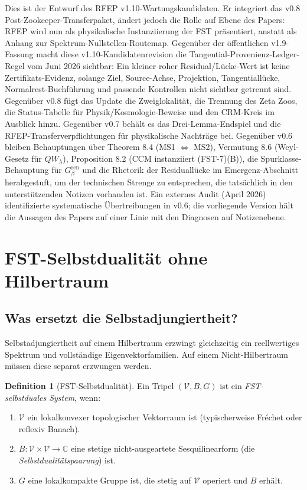 \documentclass[11pt,a4paper]{article}
\theoremstyle{plain}
\theoremstyle{definition}
\newtheorem{definition}[theorem]{Definition}
\newcommand{\C}{\mathbb{C}}
\newcommand{\V}{\mathcal{V}}
\begin{document}
Dies ist der Entwurf des RFEP v1.10-Wartungskandidaten. Er integriert das v0.8 Post-Zookeeper-Transferpaket,
ändert jedoch die Rolle auf Ebene des Papers: RFEP wird nun als physikalische Instanziierung
der FST präsentiert, anstatt als Anhang zur Spektrum-Nullstellen-Routemap. Gegenüber
der öffentlichen v1.9-Fassung macht diese v1.10-Kandidatenrevision die
Tangential-Provenienz-Ledger-Regel vom Juni 2026 sichtbar: Ein kleiner
roher Residual/Lücke-Wert ist keine Zertifikats-Evidenz, solange Ziel,
Source-Achse, Projektion, Tangentiallücke, Normalrest-Buchführung und
passende Kontrollen nicht sichtbar getrennt sind. Gegenüber v0.8
fügt das Update die Zweiglokalität, die Trennung des Zeta Zoos, die Status-Tabelle
für Physik/Kosmologie-Beweise und den CRM-Kreis im Ausblick hinzu. Gegenüber v0.7
behält es das Drei-Lemma-Endspiel und die RFEP-Transferverpflichtungen für physikalische
Nachträge bei. Gegenüber v0.6 bleiben Behauptungen über Theorem 8.4 (MS1 $\Leftrightarrow$ MS2),
Vermutung 8.6 (Weyl-Gesetz für $QW_\lambda$), Proposition 8.2 (CCM instanziiert (FST-7)(B)),
die Spurklasse-Behauptung für $G_\beta^{\mathrm{ren}}$ und die Rhetorik der Residuallücke
im Emergenz-Abschnitt herabgestuft, um der technischen Strenge zu entsprechen, die
tatsächlich in den unterstützenden Notizen vorhanden ist. Ein externes Audit (April 2026)
identifizierte systematische Übertreibungen in v0.6; die vorliegende Version hält
die Aussagen des Papers auf einer Linie mit den Diagnosen auf Notizenebene.

\section{FST-Selbstdualität ohne Hilbertraum}
\label{sec:fst-duality}

\subsection{Was ersetzt die Selbstadjungiertheit?}

Selbstadjungiertheit auf einem Hilbertraum erzwingt gleichzeitig ein reellwertiges Spektrum
und vollständige Eigenvektorfamilien. Auf einem Nicht-Hilbertraum müssen diese
separat erzwungen werden.

\begin{definition}[FST-Selbstdualität]
\label{def:fst-duality}
Ein Tripel $(\V, B, G)$ ist ein \emph{FST-selbstduales System}, wenn:
\begin{enumerate}[leftmargin=*]
  \item $\V$ ein lokalkonvexer topologischer Vektorraum ist (typischerweise
    Fr\'echet oder reflexiv Banach).
  \item $B: \V \times \V \to \C$ eine stetige nicht-ausgeartete
    Sesquilinearform (die \emph{Selbstdualitätspaarung}) ist.
  \item $G$ eine lokalkompakte Gruppe ist, die stetig auf $\V$ operiert
    und $B$ erhält.
\end{enumerate}
\end{definition}
\end{document}
